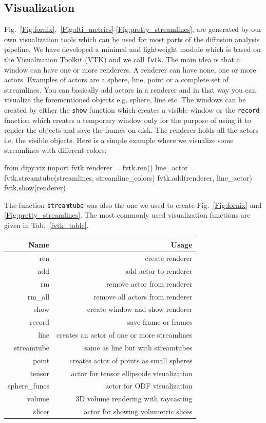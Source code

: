 \documentclass{bioinfo}
\begin{document}
\subsection{Visualization}
Fig.~\ref{Fig:fornix},~\ref{Fig:dti_metrics}-\ref{Fig:pretty_streamlines},
are generated by
our own visualization tools which can be used for most parts of the diffusion
analysis pipeline. We have developed a minimal and lightweight module which is based on the Visualization Toolkit (VTK) \citep{schroeder:01} and we call
\texttt{fvtk}. The main idea is that a window can have one or more renderers.
A renderer can have none, one or more actors. Examples of actors are a sphere,
line, point or a complete set of streamlines. You can basically add actors in a
renderer and in that way you can visualize the forementioned objects e.g.
sphere, line etc. The windows can
be created by either the \texttt{show} function which creates a visible window
or the \texttt{record} function which creates a temporary window only for the
purpose of using it to render the objects and save the frames on disk. The
renderer holds all the actors i.e. the visible objects. Here is a simple example
where we visualize some streamlines with different colors:
\begin{python}
from dipy.viz import fvtk
renderer = fvtk.ren()
line_actor = fvtk.streamtube(streamlines,
                             streamline_colors)
fvtk.add(renderer, line_actor)
fvtk.show(renderer)
\end{python}
The function \texttt{streamtube} was also the one we used to create Fig.~\ref{Fig:fornix} and \ref{Fig:pretty_streamlines}.
The most commonly used visualization functions are given in Tab.~\ref{fvtk_table}.

\begin{table}[th] 
{\begin{tabular}{rr} \hline
Name & Usage \\ \hline
ren & create renderer\\
add & add actor to renderer\\
rm  & remove actor from renderer \\
rm\_all & remove all actors from renderer \\
show & create window and show renderer \\
record & save frame or frames \\
line & creates an actor of one or more streamlines \\
streamtube & same as line but with streamtubes \\
point & creates actor of points as small spheres \\
tensor & actor for tensor ellipsoids visualization\\
sphere\_funcs & actor for ODF visualization \\
volume & 3D volume rendering with raycasting \\
slicer & actor for showing volumetric slices \\
\hline
\end{tabular}}{}
\end{table}
\end{document}
